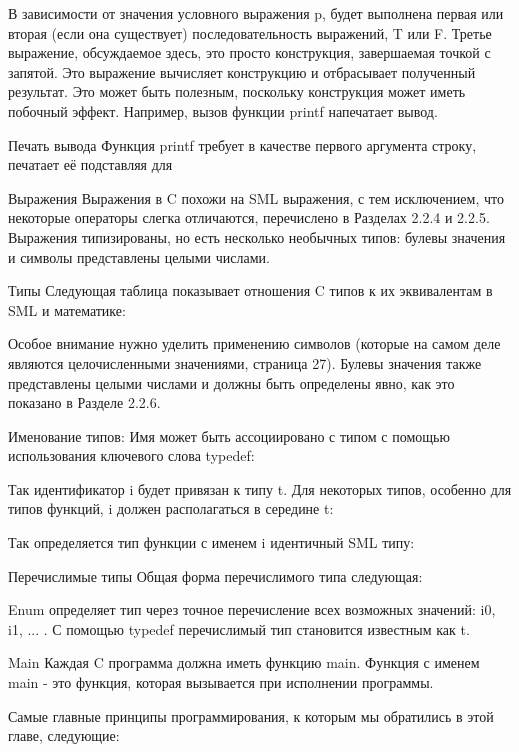 В зависимости от значения условного выражения p, будет выполнена первая или вторая (если она существует) последовательность выражений, T или F. Третье выражение, обсуждаемое здесь, это просто конструкция, завершаемая точкой с запятой. Это выражение вычисляет конструкцию и отбрасывает полученный результат. Это может быть полезным, поскольку конструкция может иметь побочный эффект. Например, вызов функции printf напечатает вывод.

Печать вывода Функция printf требует в качестве первого аргумента строку, печатает её подставляя для %


Выражения Выражения в C похожи на SML выражения, с тем исключением, что некоторые операторы слегка отличаются, перечислено в Разделах 2.2.4 и 2.2.5. Выражения типизированы, но есть несколько необычных типов: булевы значения и символы представлены целыми числами.

Типы Следующая таблица показывает отношения C типов к их эквивалентам в SML и математике:

Особое внимание нужно уделить применению символов (которые на самом деле являются целочисленными значениями, страница 27). Булевы значения также представлены целыми числами и должны быть определены явно, как это показано в Разделе 2.2.6.

Именование типов: Имя может быть ассоциировано с типом с помощью использования ключевого слова typedef:

Так идентификатор i будет привязан к типу t. Для некоторых типов, особенно для типов функций, i должен располагаться в середине t:

Так определяется тип функции с именем i идентичный SML типу:

Перечислимые типы Общая форма перечислимого типа следующая:

Enum определяет тип через точное перечисление всех возможных значений: i0, i1, ... . С помощью typedef перечислимый тип становится известным как t.

Main Каждая C программа должна иметь функцию main. Функция с именем main - это функция, которая вызывается при исполнении программы.

Самые главные принципы программирования, к которым мы обратились в этой главе, следующие:


